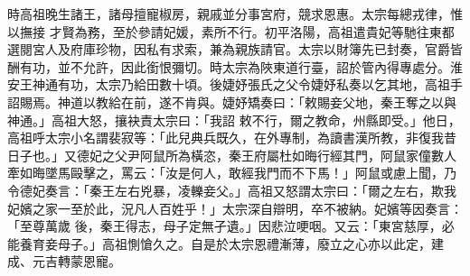 \begin{pinyinscope}
 時高祖晚生諸王，諸母擅寵椒房，親戚並分事宮府，競求恩惠。太宗每總戎律，惟以撫接
 才賢為務，至於參請妃媛，素所不行。初平洛陽，高祖遣貴妃等馳往東都選閱宮人及府庫珍物，因私有求索，兼為親族請官。太宗以財簿先已封奏，官爵皆酬有功，並不允許，因此銜恨彌切。時太宗為陜東道行臺，詔於管內得專處分。淮安王神通有功，太宗乃給田數十頃。後婕妤張氏之父令婕妤私奏以乞其地，高祖手詔賜焉。神道以教給在前，遂不肯與。婕妤矯奏曰：「敕賜妾父地，秦王奪之以與神通。」高祖大怒，攘袂責太宗曰：「我詔
 敕不行，爾之教命，州縣即受。」他日，高祖呼太宗小名謂裴寂等：「此兒典兵既久，在外專制，為讀書漢所教，非復我昔日子也。」又德妃之父尹阿鼠所為橫恣，秦王府屬杜如晦行經其門，阿鼠家僮數人牽如晦墜馬毆擊之，罵云：「汝是何人，敢經我門而不下馬！」阿鼠或慮上聞，乃令德妃奏言：「秦王左右兇暴，凌轢妾父。」高祖又怒謂太宗曰：「爾之左右，欺我妃嬪之家一至於此，況凡人百姓乎！」太宗深自辯明，卒不被納。妃嬪等因奏言：「至尊萬歲
 後，秦王得志，母子定無孑遺。」因悲泣哽咽。又云：「東宮慈厚，必能養育妾母子。」高祖惻愴久之。自是於太宗恩禮漸薄，廢立之心亦以此定，建成、元吉轉蒙恩寵。




\end{pinyinscope}
